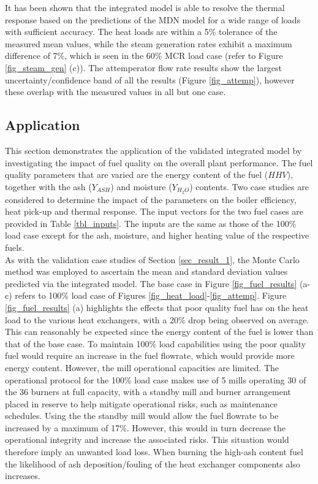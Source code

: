\documentclass[a4paper,fleqn]{cas-sc}
\begin{document}
It has been shown that the integrated model is able to resolve the thermal response based on the predictions of the MDN model for a wide range of loads with sufficient accuracy. The heat loads are within a 5\% tolerance of the measured mean values, while the steam generation rates exhibit a maximum difference of 7\%, which is seen in the 60\% MCR load case (refer to Figure \ref{fig_steam_gen} (c)). The attemperator flow rate results show the largest uncertainty/confidence band of all the results (Figure \ref{fig_attemp}), however these overlap with the measured values in all but one case. 
\subsection{Application}
This section demonstrates the application of the validated integrated model by investigating the impact of fuel quality on the overall plant performance. The fuel quality parameters that are varied are the energy content of the fuel ($HHV$), together with the ash ($Y_{ASH}$) and moisture ($Y_{H_{2}O}$) contents. Two case studies are considered to determine the impact of the parameters on the boiler efficiency, heat pick-up and thermal response. The input vectors for the two fuel cases are provided in Table \ref{tbl_inputs}. The inputs are the same as those of the 100\% load case except for the ash, moisture, and higher heating value of the respective fuels.\\

As with the validation case studies of Section \ref{sec_result_1}, the Monte Carlo method was employed to ascertain the mean and standard deviation values predicted via the integrated model. The base case in Figure \ref{fig_fuel_results} (a-c) refers to 100\% load case of Figures \ref{fig_heat_load}-\ref{fig_attemp}. Figure \ref{fig_fuel_results}  (a) highlights the effects that poor quality fuel has on the heat load to the various heat exchangers, with a 20\% drop being observed on average. This can reasonably be expected since the energy content of the fuel is lower than that of the base case. To maintain 100\% load capabilities using the poor quality fuel would require an increase in the fuel flowrate, which would provide more energy content. However, the mill operational capacities are limited. The operational protocol for the 100\% load case makes use of 5 mills operating 30 of the 36 burners at full capacity, with a standby mill and burner arrangement placed in reserve to help mitigate operational risks, such as maintenance schedules. Using the the standby mill would allow the fuel flowrate to be increased by a maximum of 17\%. However, this would in turn decrease the operational integrity and increase the associated risks. This situation would therefore imply an unwanted load loss. When burning the high-ash content fuel the likelihood of ash deposition/fouling of the heat exchanger components also increases.\\
\end{document}
